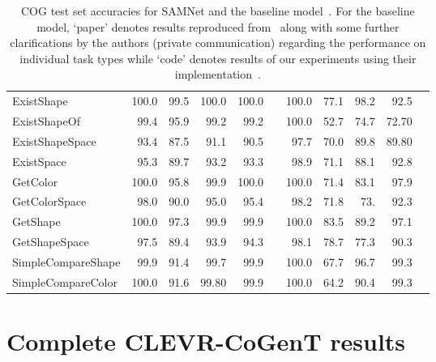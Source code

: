 \begin{table*}[htb]
\begin{adjustbox}{width=\textwidth}
\begin{tabular}{l r r r r r r r r r r}
			ExistShape			&	100.0	&	99.5	&	100.0	&	100.0	&	&	100.0	&	77.1	&	98.2	&	92.5 \\
			ExistShapeOf			&	99.4	&	95.9	&	99.2	&	99.2	&	&	100.0	&	52.7	&	74.7	&	72.70 \\
			ExistShapeSpace			&	93.4	&	87.5	&	91.1	&	90.5	&	&	97.7	&	70.0	&	89.8	&	89.80 \\
			ExistSpace			&	95.3	&	89.7	&	93.2	&	93.3	&	&	98.9	&	71.1	&	88.1	&	92.8 \\
			GetColor			&	100.0	&	95.8	&	99.9	&	100.0	&	&	100.0	&	71.4	&	83.1	&	97.9 \\
			GetColorSpace			&	98.0	&	90.0	&	95.0	&	95.4	&	&	98.2	&	71.8	&	73.	&	92.3 \\
			GetShape			&	100.0	&	97.3	&	99.9	&	99.9	&	&	100.0	&	83.5	&	89.2	&	97.1	 \\
			GetShapeSpace			&	97.5	&	89.4	&	93.9	&	94.3	&	&	98.1	&	78.7	&	77.3	&	90.3 \\
			SimpleCompareShape		&	99.9	&	91.4	&	99.7	&	99.9	&	&	100.0	&	67.7	&	96.7	&	99.3 \\
			SimpleCompareColor		&	100.0	&	91.6	&	99.80	&	99.9	&	&	100.0	&	64.2	&	90.4	&	99.3 \\
			\bottomrule[1.25pt]
		\end{tabular}
	\end{adjustbox}
	\smallskip
	\caption{COG test set accuracies for SAMNet and the baseline model~\cite{yang2018dataset}. For the baseline model,
		`paper' denotes results reproduced from~\cite{yang2018dataset} along with some further clarifications by the authors (private communication)  regarding the performance on individual task types while `code' denotes results of our experiments using their implementation~\cite{yang2018implement}.}
	\label{tab:all-results}
\end{table*}

\clearpage
\section{Complete CLEVR-CoGenT results}
\label{sec:full-cogent-results}

